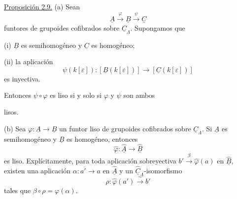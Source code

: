 \underline{Proposición 2.9.} (a) Sean
\[
 \underline A\xrightarrow{\ \varphi\ }\underline B
 \xrightarrow{\ \psi\ }\underline C
\]
funtores de grupoides cofibrados sobre $\underline C_\Lambda$.
Supongamos que

(i) $\underline B$ es semihomogéneo y $\underline C$ es
homogéneo;

(ii) la aplicación
\[
 \psi(k[\varepsilon]):[\underline B(k[\varepsilon])]
 \longrightarrow[\underline C(k[\varepsilon])]
\]
es inyectiva.

Entonces $\psi\circ\varphi$ es liso si y solo si $\varphi$ y
$\psi$ son ambos


lisos.

(b) Sea $\varphi:\underline A\longrightarrow\underline B$ un
funtor liso de grupoides cofibrados sobre $\underline C_\Lambda$.
Si $\underline A$ es semihomogéneo y $\underline B$ es
homogéneo, entonces
\[
 \widehat\varphi:\widehat{\underline A}
 \longrightarrow\widehat{\underline B}
\]
es liso. Explícitamente, para toda aplicación sobreyectiva
$b'\xrightarrow{\beta}\widehat\varphi(a)$ en
$\widehat{\underline B}$, existen una aplicación
$\alpha:a'\longrightarrow a$ en $\widehat{\underline A}$ y un
$\widehat{\underline C}_\Lambda$-isomorfismo
\[
 \rho:\widehat\varphi(a')\xrightarrow{\ \sim\ }b'
\]
tales que $\beta\circ\rho=\varphi(\alpha)$.

